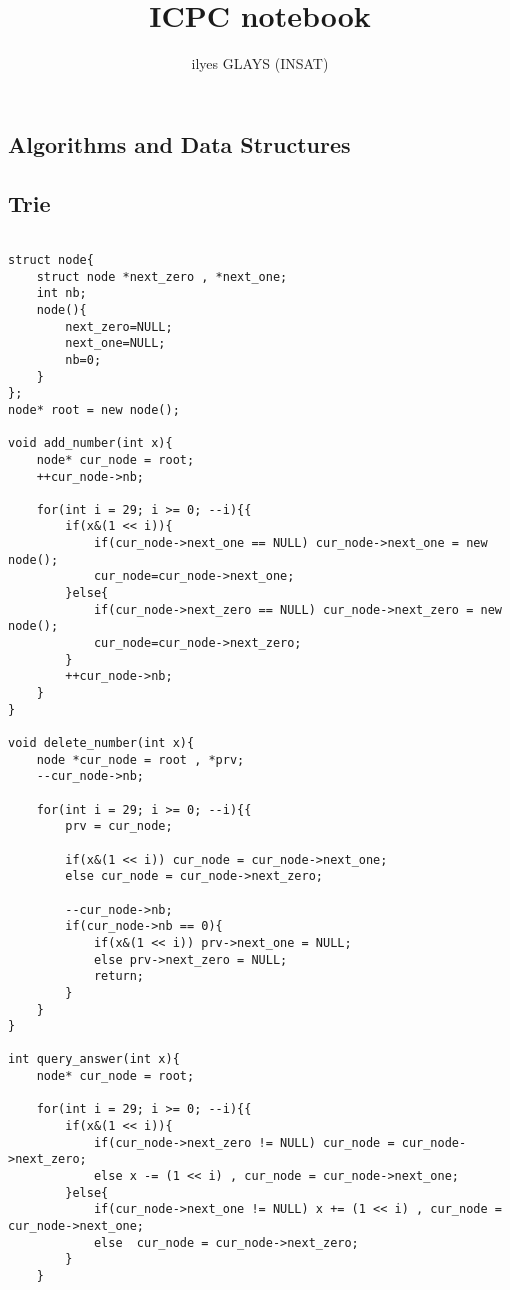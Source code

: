 \documentclass[12pt,a4paper,onesided]{article}
\begin{document}
\title{ICPC notebook}
\author{ilyes GLAYS (INSAT)}
\date{ }
\maketitle


\begin{multicols}{3}

\section{Algorithms and Data Structures}
\subsection{Trie}
\begin{lstlisting}

struct node{
    struct node *next_zero , *next_one;
    int nb;
    node(){
        next_zero=NULL;
        next_one=NULL;
        nb=0;
    }
};
node* root = new node();
 
void add_number(int x){
    node* cur_node = root;
    ++cur_node->nb;
	
    for(int i = 29; i >= 0; --i){{
        if(x&(1 << i)){
            if(cur_node->next_one == NULL) cur_node->next_one = new node();
            cur_node=cur_node->next_one;
        }else{
            if(cur_node->next_zero == NULL) cur_node->next_zero = new node();
            cur_node=cur_node->next_zero;
        }
        ++cur_node->nb;
    }
}
 
void delete_number(int x){
    node *cur_node = root , *prv;
    --cur_node->nb;
    
	for(int i = 29; i >= 0; --i){{
        prv = cur_node;
 
        if(x&(1 << i)) cur_node = cur_node->next_one;
        else cur_node = cur_node->next_zero;
        
        --cur_node->nb;
        if(cur_node->nb == 0){
            if(x&(1 << i)) prv->next_one = NULL;
            else prv->next_zero = NULL;
            return;
        }
    }
}
 
int query_answer(int x){
    node* cur_node = root;
    
	for(int i = 29; i >= 0; --i){{
        if(x&(1 << i)){
            if(cur_node->next_zero != NULL) cur_node = cur_node->next_zero;
            else x -= (1 << i) , cur_node = cur_node->next_one;
        }else{
            if(cur_node->next_one != NULL) x += (1 << i) , cur_node = cur_node->next_one;
            else  cur_node = cur_node->next_zero;
        }
    }
 

\end{lstlisting}
\end{multicols}
\end{document}
